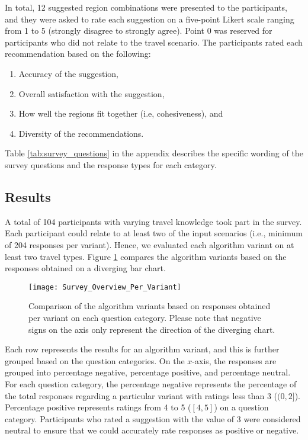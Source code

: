 In total, 12 suggested region combinations were presented to the participants, and they were asked to rate each suggestion on a five-point Likert scale ranging from 1 to 5 (strongly disagree to strongly agree). Point 0 was reserved for participants who did not relate to the travel scenario. The participants rated each recommendation based on the following:
\begin{enumerate}
    \item Accuracy of the suggestion,
    \item Overall satisfaction with the suggestion,
    \item How well the regions fit together (i.e, cohesiveness), and
    \item Diversity of the recommendations.
\end{enumerate}

Table \ref{tab:survey_questions} in the appendix describes the specific wording of the survey questions and the response types for each category.

\subsection{Results}
A total of 104 participants with varying travel knowledge took part in the survey. Each participant could relate to at least two of the input scenarios (i.e., minimum of 204 responses per variant). Hence, we evaluated each algorithm variant on at least two travel types. Figure \ref{fig:survey_overview} compares the algorithm variants based on the responses obtained on a diverging bar chart.

\begin{figure}[ht]
    \centering
    \texttt{[image: Survey\_Overview\_Per\_Variant]}
    \caption[Comparison of the algorithm variants based on responses obtained per variant on each question category]{Comparison of the algorithm variants based on responses obtained per variant on each question category. Please note that negative signs on the axis only represent the direction of the diverging chart.}
    \label{fig:survey_overview}
\end{figure}

Each row represents the results for an algorithm variant, and this is further grouped based on the question categories. On the $x$-axis, the responses are grouped into percentage negative, percentage positive, and percentage neutral. For each question category, the percentage negative represents the percentage of the total responses regarding a particular variant with ratings less than 3 ($(0, 2]$). Percentage positive represents ratings from 4 to 5 ($[4,5]$) on a question category. Participants who rated a suggestion with the value of 3 were considered neutral to ensure that we could accurately rate responses as positive or negative.



